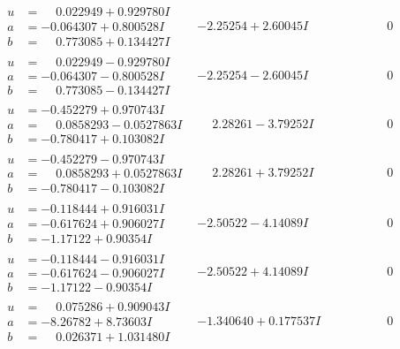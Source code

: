 \documentclass[1p]{elsarticle_modified}
\theoremstyle{definition}
\begin{document}
$$\begin{array}{c|c|c}
\begin{aligned}
u &= \phantom{-}0.022949 + 0.929780 I \\
a &= -0.064307 + 0.800528 I \\
b &= \phantom{-}0.773085 + 0.134427 I\end{aligned}
 & -2.25254 + 2.60045 I & \phantom{-0.000000 } 0 \\ \hline\begin{aligned}
u &= \phantom{-}0.022949 - 0.929780 I \\
a &= -0.064307 - 0.800528 I \\
b &= \phantom{-}0.773085 - 0.134427 I\end{aligned}
 & -2.25254 - 2.60045 I & \phantom{-0.000000 } 0 \\ \hline\begin{aligned}
u &= -0.452279 + 0.970743 I \\
a &= \phantom{-}0.0858293 - 0.0527863 I \\
b &= -0.780417 + 0.103082 I\end{aligned}
 & \phantom{-}2.28261 - 3.79252 I & \phantom{-0.000000 } 0 \\ \hline\begin{aligned}
u &= -0.452279 - 0.970743 I \\
a &= \phantom{-}0.0858293 + 0.0527863 I \\
b &= -0.780417 - 0.103082 I\end{aligned}
 & \phantom{-}2.28261 + 3.79252 I & \phantom{-0.000000 } 0 \\ \hline\begin{aligned}
u &= -0.118444 + 0.916031 I \\
a &= -0.617624 + 0.906027 I \\
b &= -1.17122 + 0.90354 I\end{aligned}
 & -2.50522 - 4.14089 I & \phantom{-0.000000 } 0 \\ \hline\begin{aligned}
u &= -0.118444 - 0.916031 I \\
a &= -0.617624 - 0.906027 I \\
b &= -1.17122 - 0.90354 I\end{aligned}
 & -2.50522 + 4.14089 I & \phantom{-0.000000 } 0 \\ \hline\begin{aligned}
u &= \phantom{-}0.075286 + 0.909043 I \\
a &= -8.26782 + 8.73603 I \\
b &= \phantom{-}0.026371 + 1.031480 I\end{aligned}
 & -1.340640 + 0.177537 I & \phantom{-0.000000 } 0 \\ \hline\begin{aligned}

\end{aligned}
\end{array}$$
\end{document}
